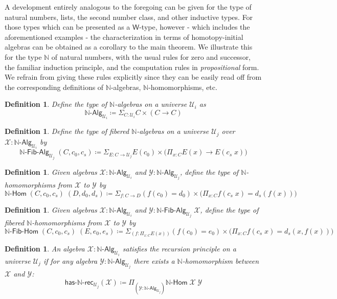 \documentclass[reqno,10pt,a4paper,oneside]{amsart}
\newcommand{\X}{\mathcal{X}}
\newcommand{\Y}{\mathcal{Y}}
\newcommand{\prd}[1]{\Pi_{#1}}
\newcommand{\sm}[1]{\Sigma_{#1}}
\newcommand{\defeq}{\coloneqq}
\newcommand{\nat}{\ensuremath{\mathbb{N}}}
\newcommand{\W}{\mathsf{W}}
\newcommand{\UU}{\mathcal{U}}
\newcommand{\NatAlg}{\nat\text{-}\mathsf{Alg}}
\newcommand{\NatHom}{\nat\text{-}\mathsf{Hom}}
\newcommand{\HasNatRec}{\mathsf{has}\text{-}\nat\text{-}\mathsf{rec}}
\newcommand{\NatFibAlg}{\nat\text{-}\mathsf{Fib}\text{-}\mathsf{Alg}}
\newcommand{\NatFibHom}{\nat\text{-}\mathsf{Fib}\text{-}\mathsf{Hom}}
\numberwithin{equation}{section}
\theoremstyle{mythm}
\theoremstyle{mydef}
\newtheorem{definition}[theorem]{Definition}
\theoremstyle{myrmk}
\begin{document}
A development entirely analogous to the foregoing can be given for the type of natural numbers, lists, the second number class, and other inductive types. For those types which can be presented as a $\W$-type, however - which includes the aforementioned examples - the characterization in terms of homotopy-initial algebras can be obtained as a corollary to the main theorem. We illustrate this for the type $\nat$ of natural numbers, with the usual rules for zero and successor, the familiar induction principle, and the computation rules in \emph{propositional} form. We refrain from giving these rules explicitly since they can be easily read off from the corresponding definitions of $\nat$-algebras, $\nat$-homomorphisms, etc.

\begin{definition}\label{def:NatAlg}
Define the type of \emph{$\nat$-algebras} on a universe $\UU_i$ as 
\[\NatAlg_{\UU_i} \defeq \sm{C : \UU_i} C \times (C \to C) \]
\end{definition}

\begin{definition}\label{def:NatFibAlg}
Define the type of \emph{fibered $\nat$-algebras} on a universe $\UU_j$ over $\mathcal{X} : \NatAlg_{\UU_i}$ by
\[\NatFibAlg_{\UU_j} \; (C,c_0,c_s) \defeq \sm{E : C \to \UU_j} E(c_0) \times \big(\prd{x:C} E(x) \to E(c_s \; x)\big) \]
\end{definition}

\begin{definition}\label{def:NatHom}
Given algebras $\X : \NatAlg_{\UU_i}$ and $\Y : \NatAlg_{\UU_j}$, define the type of \emph{$\nat$-homomorphisms} from $\X$ to $\Y$ by 
\[\NatHom \; (C,c_0,c_s) \; (D,d_0,d_s) \defeq \sm{f:C \to D} (f(c_0) = d_0) \times \big(\prd{x:C} f(c_s\;x) = d_s(f(x))\big) \]
\end{definition}

\begin{definition}\label{def:NatFibHom}
Given algebras $\X : \NatAlg_{\UU_i}$ and $\Y : \NatFibAlg_{\UU_j} \; \X$, define the type of \emph{fibered $\nat$-homomorphisms} from $\X$ to $\Y$ by
\[\NatFibHom \; (C,c_0,c_s) \; (E,e_0,e_s) \defeq \sm{(f:\prd{x:C} E(x))} (f(c_0) = e_0) \times \big(\prd{x:C} f(c_s\;x) = d_s(x,f(x))\big) \]
\end{definition}

\begin{definition}\label{def:NatRec}
An algebra $\X : \NatAlg_{\UU_i}$ \emph{satisfies the recursion principle} on a universe $\UU_j$ if for any 
algebra $\Y : \NatAlg_{\UU_j}$ there exists a $\nat$-homomorphism between $\X$ and $\Y$:
\[\HasNatRec_{\UU_j}(\X) \defeq \prd{(\Y:\NatAlg_{\UU_j})} \NatHom \; \X \; \Y\] 
\end{definition}
\end{document}
